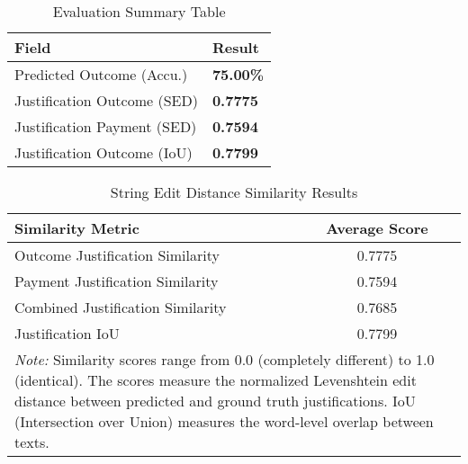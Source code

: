 
\begin{table}[H]
\centering
\caption{Evaluation Summary Table}
\label{tab:evaluation_summary}
\begin{tabular}{@{}lp{2cm}@{}}
\toprule
\textbf{Field} & \textbf{Result} \\
\midrule
Predicted Outcome (Accu.) & \textbf{75.00\%} \\
Justification Outcome (SED) &  \textbf{0.7775} \\
Justification Payment (SED) &  \textbf{0.7594} \\
Justification Outcome (IoU) &  \textbf{0.7799} \\
\bottomrule
\end{tabular}
\end{table}

\begin{table}[!ht]
\centering
\caption{String Edit Distance Similarity Results}
\label{tab:string_edit_distance_results}
\begin{tabular}{lc}
\toprule
\textbf{Similarity Metric} & \textbf{Average Score} \\
\midrule
Outcome Justification Similarity & 0.7775 \\
Payment Justification Similarity & 0.7594 \\
Combined Justification Similarity & 0.7685 \\
Justification IoU & 0.7799 \\
\midrule
\multicolumn{2}{p{13cm}}{\textit{Note:} Similarity scores range from 0.0 (completely different) to 1.0 (identical). 
The scores measure the normalized Levenshtein edit distance between predicted and ground truth justifications.
IoU (Intersection over Union) measures the word-level overlap between texts.} \\
\bottomrule
\end{tabular}
\end{table}

